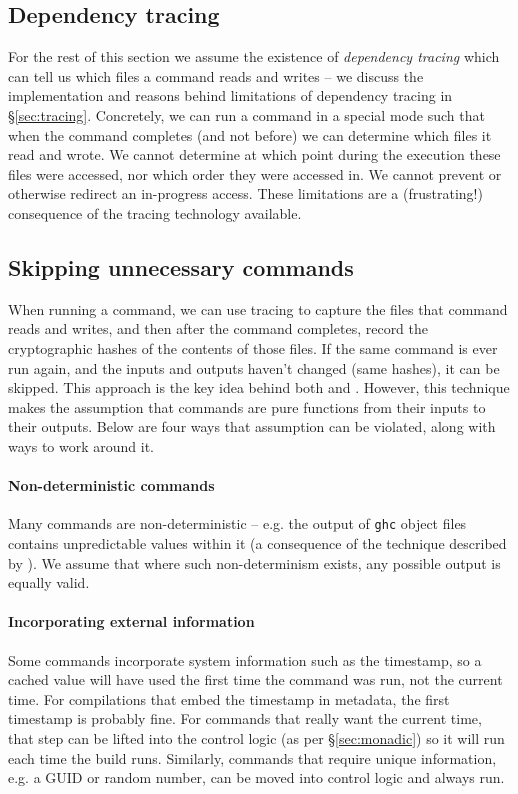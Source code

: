 \subsection{Dependency tracing}
\label{sec:assume_tracing}

For the rest of this section we assume the existence of \emph{dependency tracing} which can tell us which files a command reads and writes -- we discuss the implementation and reasons behind limitations of dependency tracing in \S\ref{sec:tracing}. Concretely, we can run a command in a special mode such that when the command completes (and not before) we can determine which files it read and wrote. We cannot determine at which point during the execution these files were accessed, nor which order they were accessed in. We cannot prevent or otherwise redirect an in-progress access. These limitations are a (frustrating!) consequence of the tracing technology available.

\subsection{Skipping unnecessary commands}
\label{sec:skipping_unnecessary}

When running a command, we can use tracing to capture the files that command reads and writes, and then after the command completes, record the cryptographic hashes of the contents of those files. If the same command is ever run again, and the inputs and outputs haven't changed (same hashes), it can be skipped. This approach is the key idea behind both \Memoize\cite{memoize} and \Fabricate\cite{fabricate}. However, this technique makes the assumption that commands are pure functions from their inputs to their outputs. Below are four ways that assumption can be violated, along with ways to work around it.

\paragraph{Non-deterministic commands} Many commands are non-deterministic -- e.g. the output of \texttt{ghc} object files contains unpredictable values within it (a consequence of the technique described by \citet{lennart:unique_names}). We assume that where such non-determinism exists, any possible output is equally valid.

\paragraph{Incorporating external information} Some commands incorporate system information such as the timestamp, so a cached value will have used the first time the command was run, not the current time. For compilations that embed the timestamp in metadata, the first timestamp is probably fine. For commands that really want the current time, that step can be lifted into the control logic (as per \S\ref{sec:monadic}) so it will run each time the build runs. Similarly, commands that require unique information, e.g. a GUID or random number, can be moved into control logic and always run.

